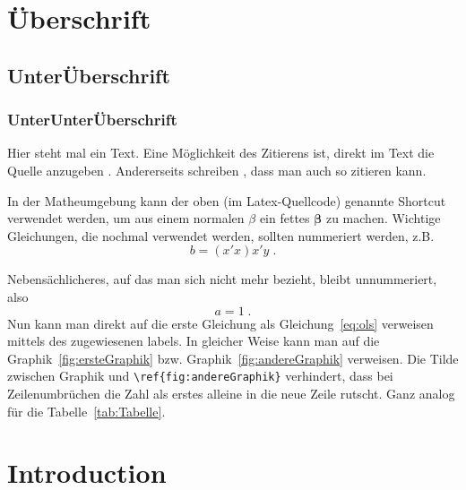 \documentclass[a4paper,12pt]{article}
\newcommand{\bs}{\boldsymbol}  %
\begin{document}
% 
% 




\setcounter{page}{1}        %


\section{\"Uberschrift}
\label{Kapitel1}

\subsection{Unter\"Uberschrift}

\subsubsection*{UnterUnter\"Uberschrift}



Hier steht mal ein Text. Eine M\"oglichkeit des Zitierens ist, direkt
im Text die Quelle anzugeben \citep[see][pp.225-369]{key1}.
Andererseits schreiben \cite{key2}, dass man auch so zitieren kann.

In der Matheumgebung kann der oben (im Latex-Quellcode) genannte Shortcut verwendet
werden, um aus einem normalen $\beta$ ein fettes $\bs \beta$ zu
machen. Wichtige Gleichungen, die nochmal verwendet werden, sollten nummeriert werden, z.B.
\begin{equation}
\label{eq:ols}
   b = (x'x)x'y \;.
\end{equation}

Nebens\"achlicheres, auf das man sich nicht mehr bezieht, bleibt unnummeriert, also 
\begin{equation*}
   a = 1\;.
\end{equation*}
Nun kann man direkt auf die erste Gleichung als Gleichung~\eqref{eq:ols} verweisen mittels des zugewiesenen labels. In gleicher Weise kann man auf die Graphik~\ref{fig:ersteGraphik} bzw. Graphik~\ref{fig:andereGraphik} verweisen. Die Tilde zwischen \glqq Graphik\grqq{} und \glqq \verb|\ref{fig:andereGraphik}|\grqq{} verhindert, dass bei Zeilenumbr\"uchen die Zahl als erstes alleine in die neue Zeile rutscht. Ganz analog f\"ur die Tabelle~\ref{tab:Tabelle}. 


\section{Introduction}
\end{document}
